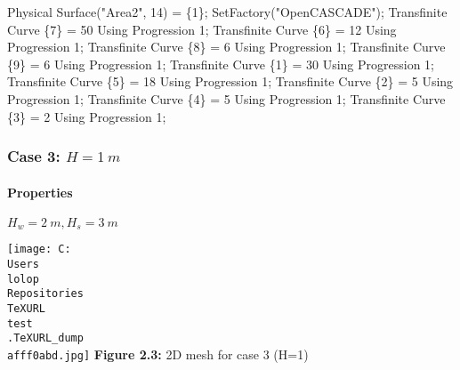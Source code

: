 \documentclass[11pt]{article}
\newenvironment{Shaded}{}{}
\newcommand{\DecValTok}[1]{\textcolor[rgb]{0.25,0.63,0.44}{{#1}}}
\newcommand{\StringTok}[1]{\textcolor[rgb]{0.25,0.44,0.63}{{#1}}}
\newcommand{\NormalTok}[1]{{#1}}
\newcommand{\OperatorTok}[1]{\textcolor[rgb]{0.40,0.40,0.40}{{#1}}}
\begin{document}
\begin{Shaded}
\begin{Highlighting}[]
\NormalTok{Physical Surface}\OperatorTok{(}\StringTok{"Area2"}\OperatorTok{,} \DecValTok{14}\OperatorTok{)} \OperatorTok{=} \OperatorTok{\{}\DecValTok{1}\OperatorTok{\};}
\NormalTok{SetFactory}\OperatorTok{(}\StringTok{"OpenCASCADE"}\OperatorTok{);}
\NormalTok{Transfinite Curve }\OperatorTok{\{}\DecValTok{7}\OperatorTok{\}} \OperatorTok{=} \DecValTok{50}\NormalTok{ Using Progression }\DecValTok{1}\OperatorTok{;}
\NormalTok{Transfinite Curve }\OperatorTok{\{}\DecValTok{6}\OperatorTok{\}} \OperatorTok{=} \DecValTok{12}\NormalTok{ Using Progression }\DecValTok{1}\OperatorTok{;}
\NormalTok{Transfinite Curve }\OperatorTok{\{}\DecValTok{8}\OperatorTok{\}} \OperatorTok{=} \DecValTok{6}\NormalTok{ Using Progression }\DecValTok{1}\OperatorTok{;}
\NormalTok{Transfinite Curve }\OperatorTok{\{}\DecValTok{9}\OperatorTok{\}} \OperatorTok{=} \DecValTok{6}\NormalTok{ Using Progression }\DecValTok{1}\OperatorTok{;}
\NormalTok{Transfinite Curve }\OperatorTok{\{}\DecValTok{1}\OperatorTok{\}} \OperatorTok{=} \DecValTok{30}\NormalTok{ Using Progression }\DecValTok{1}\OperatorTok{;}
\NormalTok{Transfinite Curve }\OperatorTok{\{}\DecValTok{5}\OperatorTok{\}} \OperatorTok{=} \DecValTok{18}\NormalTok{ Using Progression }\DecValTok{1}\OperatorTok{;}
\NormalTok{Transfinite Curve }\OperatorTok{\{}\DecValTok{2}\OperatorTok{\}} \OperatorTok{=} \DecValTok{5}\NormalTok{ Using Progression }\DecValTok{1}\OperatorTok{;}
\NormalTok{Transfinite Curve }\OperatorTok{\{}\DecValTok{4}\OperatorTok{\}} \OperatorTok{=} \DecValTok{5}\NormalTok{ Using Progression }\DecValTok{1}\OperatorTok{;}
\NormalTok{Transfinite Curve }\OperatorTok{\{}\DecValTok{3}\OperatorTok{\}} \OperatorTok{=} \DecValTok{2}\NormalTok{ Using Progression }\DecValTok{1}\OperatorTok{;}
\end{Highlighting}
\end{Shaded}

\hypertarget{case-3-h-1-m}{%
\subsubsection{\texorpdfstring{Case 3:
\(H = 1\ m\)}{Case 3: H = 1\textbackslash{} m}}\label{case-3-h-1-m}}

\hypertarget{properties-3}{%
\paragraph{Properties}\label{properties-3}}

\(H_w = 2\ m, H_s = 3\ m\)

\texttt{[image: C:\\Users\\lolop\\Repositories\\TeXURL\\test\\.TeXURL\_dump\\afff0abd.jpg]} \textbf{Figure 2.3:}
2D mesh for case 3 (H=1)
\end{document}
